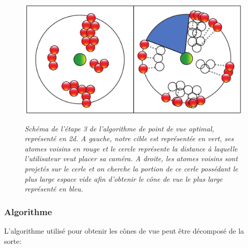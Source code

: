 \begin{figure}[h]
  \centering
  {\includegraphics[width=.5\linewidth]{./figures/ch3/voronoi_2D_algo_v2}}
    \caption{{\it Schéma de l'étape 3 de l'algorithme de point de vue optimal, représenté en 2d. A gauche, notre cible est représentée en vert, ses atomes voisins en rouge et le cercle représente la distance à laquelle l'utilisateur veut placer sa caméra. A droite, les atomes voisins sont projetés sur le cerle et on cherche la portion de ce cerle possédant le plus large espace vide afin d'obtenir le cône de vue le plus large représenté en bleu.}}
  \label{Fig:voronoi_2D_algo}
  \hspace{0.2cm}
\end{figure}

\subsubsection{Algorithme}

L'algorithme utilisé pour obtenir les cônes de vue peut être décomposé de la sorte:

